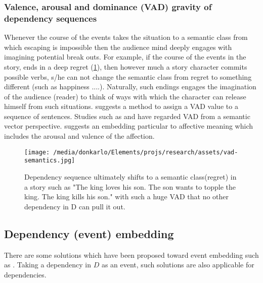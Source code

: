 \documentclass{article}
\begin{document}
	\subsubsection{Valence, arousal and dominance (VAD) gravity of dependency sequences}
	Whenever the course of the events takes the situation to a semantic class from which escaping is impossible then the audience mind deeply engages with imagining potential break outs. For example, if the course of the events in the story, ends in a deep regret (\ref{fig:vad}), then however much a story character commits possible verbs, s/he can not change the semantic class from regret to something different (such as happiness ....). Naturally, such endings engages the imagination of the audience (reader) to think of ways with which the character can release himself from such situations. \citet{buechel-2016-feelings-from-the-past-adapting-affective-lexicons-for-historical-emotion-analysis} suggests a method to assign a VAD value to a sequence of sentences. Studies such as \citet{agrawal-2018-learning-emotion-enriched-word-representations,mao-2019-sentiment-aware-word-embedding-for-emotion-classification} and 
	\citet{li-2017-inferring-affective-meanings-of-words-from-word-embedding} have regarded VAD from a semantic vector perspective. \citet{li-2017-inferring-affective-meanings-of-words-from-word-embedding} suggests an embedding particular to affective meaning which includes the arousal and valence of the affection.
	\begin{figure}[h!]
		\centering
		\texttt{[image: /media/donkarlo/Elements/projs/research/assets/vad-semantics.jpg]}
		\caption{Dependency sequence ultimately shifts to a semantic class(regret) in a story such as "The king loves his son. The son wants to topple the king. The king kills his son." with such a huge VAD that no other dependency in D can pull it out.} 
		\label{fig:vad}
	\end{figure}
	
	
	\subsection{Dependency (event) embedding} \label{sec:related-works-dependeny-embedding}
	There are some solutions which have been proposed toward event embedding such as
	\citet{weber-2018-event-representations-with-tensor-based-compositions}. Taking a dependency in $D$ as an event, such solutions are also applicable for dependencies. 
	
\end{document}
